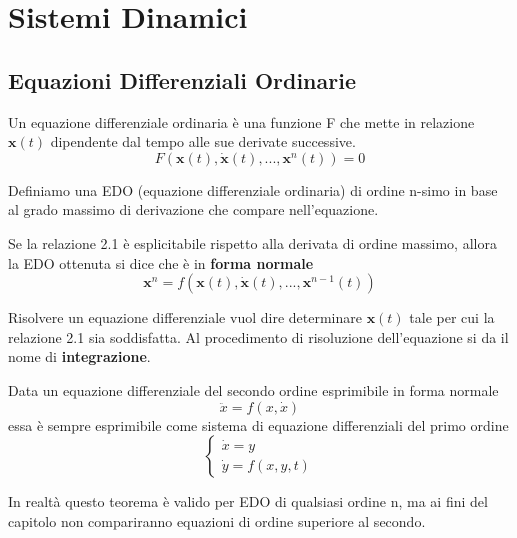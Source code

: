 \setcounter{chapter}{1}
\chapter{Sistemi Dinamici}

\section{Equazioni Differenziali Ordinarie}

Un equazione differenziale ordinaria \`{e} una funzione F che mette in relazione $\bm{x}(t)$ dipendente dal tempo alle sue derivate successive.
\begin{equation}
	F(\bm{x}(t),\dot{\bm{x}}(t),...,\bm{x}^{n}(t)) = 0
\end{equation}

\begin{definition}
	Definiamo una EDO (equazione differenziale ordinaria) di ordine n-simo in base al grado massimo di derivazione che compare nell'equazione.
\end{definition}
\begin{definition}
	Se la relazione 2.1 \`{e} esplicitabile rispetto alla derivata di ordine massimo, allora la EDO ottenuta si dice che \`{e} in \textbf{forma normale}
\begin{equation}
	\bm{x}^{n} = f(\bm{x}(t),\dot{\bm{x}}(t),...,\bm{x}^{n-1}(t))
\end{equation}
\end{definition}

\noindent Risolvere un equazione differenziale vuol dire determinare $\bm{x}(t)$ tale per cui la relazione 2.1 sia soddisfatta. Al procedimento di risoluzione dell'equazione si da il nome di \textbf{integrazione}.

\begin{theorem}
	Data un equazione differenziale del secondo ordine esprimibile in forma normale
	\begin{equation*}
		\ddot{x} = f(x,\dot{x})
	\end{equation*}
essa \`{e} sempre esprimibile come sistema di equazione differenziali del primo ordine
\begin{equation*}
	\left \{ \begin{array}{l}
		\dot{x} = y \\
		\dot{y} = f(x,y,t)
	\end{array} \right. 
\end{equation*}
\end{theorem}
\begin{remark} In realt\`{a} questo teorema \`{e} valido per EDO di qualsiasi ordine n, ma ai fini del capitolo non compariranno equazioni di ordine superiore al secondo.	
\end{remark}


